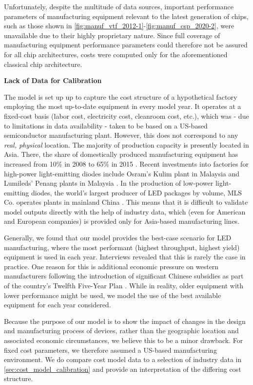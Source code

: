\documentclass[parskip=full]{article}
\begin{document}
Unfortunately, despite the multitude of data sources, important performance parameters of  manufacturing equipment relevant to the latest generation of chips, such as those shown in \cref{fig:manuf_vtf_2012-1}-\cref{fig:manuf_csp_2020-2}, were unavailable due to their highly proprietary nature. Since full coverage of manufacturing equipment performance parameters could therefore not be assured for all chip architectures, costs were computed only for the aforementioned classical chip architecture.

\textbf{Lack of Data for Calibration}

The model is set up up to capture the cost structure of a hypothetical factory employing the most up-to-date equipment in every model year. It operates at a fixed-cost basis (labor cost, electricity cost, cleanroom cost, etc.), which was - due to limitations in data availability - taken to be based on a US-based semiconductor manufacturing plant. However, this does not correspond to any \textit{real, physical} location. The majority of production capacity is presently located in Asia. There, the share of domestically produced manufacturing equipment has increased from 10\% in 2008 to 65\% in 2015 \cite{tseng2015fab}. Recent investments into factories for high-power light-emitting diodes include Osram's Kulim plant in Malaysia \cite{osram2020kulim} and Lumileds' Penang plants in Malaysia \cite{lumileds2020penang}. In the production of low-power light-emitting diodes, the world's largest producer of LED packages by volume, MLS Co. operates plants in mainland China \cite{mls2020dev}. This means that it is difficult to validate model outputs directly with the help of industry data, which (even for American and European companies) is provided only for Asia-based manufacturing lines. 

Generally, we found that our model provides the best-case scenario for LED manufacturing, where the most performant (highest throughput, highest yield) equipment is used in each year. Interviews revealed that this is rarely the case in practice. One reason for this is additional economic pressure on western manufacturers following the introduction of significant Chinese subsidies as part of the country's Twelfth Five-Year Plan \cite{sanderson2014light}. While in reality, older equipment with lower performance might be used, we model the use of the best available equipment for each year considered.

Because the purpose of our model is to show the impact of changes in the design and manufacturing process of devices, rather than the geographic location and associated economic circumstances, we believe this to be a minor drawback. For fixed cost parameters, we therefore assumed a US-based manufacturing environment. We do compare cost model data to a selection of industry data in \cref{sec:cost_model_calibration} and provide an interpretation of the differing cost structure.
\end{document}
